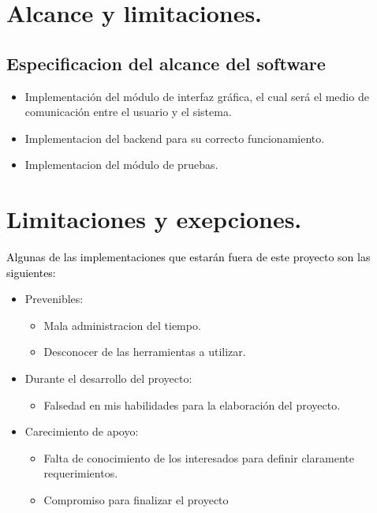 \documentclass[10pt]{article} %
\begin{document}
 \section{Alcance y limitaciones.}
 
 \subsection*{Especificacion del alcance del software}

\textcolor{black}{}
\begin{itemize}
    \item Implementación del módulo de interfaz gráfica, el cual será el medio de comunicación entre el usuario y el sistema.
    \item Implementacion del backend para su correcto funcionamiento.
    \item Implementacion del módulo de pruebas.
\end{itemize}

\section{Limitaciones y exepciones.}

\textcolor{black}{Algunas de las implementaciones que estarán fuera de este proyecto son las siguientes:
}
\begin{itemize}
    \item Prevenibles:	
    \begin{itemize}
         \item Mala administracion del tiempo.
         \item Desconocer de las herramientas a utilizar.
    \end{itemize}
    \item Durante el desarrollo del proyecto:
    \begin{itemize}
         \item Falsedad en mis habilidades para la elaboración del proyecto.
    \end{itemize}
    \item Carecimiento de apoyo:
    \begin{itemize}
         \item Falta de conocimiento de los interesados para definir claramente requerimientos.
         \item Compromiso para finalizar el proyecto
    \end{itemize}
\end{itemize}

 

 
\end{document}
